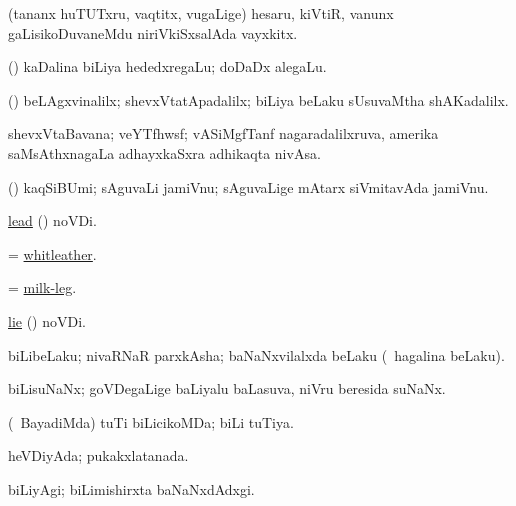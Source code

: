 \bentry
{}
\gl{\nA}
\bmng
(tananx huTUTxru, vaqtitx, \mo vugaLige) hesaru, kiVtiR, \mo vanunx gaLisikoDuvaneMdu niriVkiSxsalAda vayxkitx. 
\emng
\eentry

\bentry
{}
\gl{\nA}
\bmng
(\rUpa) kaDalina biLiya hededxregaLu; doDaDx alegaLu. 
\emng
\eentry

\bentry
{}
\gl{\kirxvi}
\bmng
(\loVvi) beLAgxvinalilx; shevxVtatApadalilx; biLiya beLaku sUsuvaMtha shAKadalilx. 
\emng
\eentry

\bentry
{}
\gl{\nA}
\bmng
shevxVtaBavana; veYTfhwsf; vASiMgfTanf nagaradalilxruva, amerika saMsAthxnagaLa adhayxkaSxra adhikaqta nivAsa. 
\emng
\eentry

\bentry
{}
\gl{\nA}
\bmng
(\birx) kaqSiBUmi; sAguvaLi jamiVnu; sAguvaLige mAtarx siVmitavAda jamiVnu. 
\emng
\eentry

\bentry
{}
\gl{\nA}
\bmng
\hyperref{kandict_l.pdf}{L}{lead(1) pagu(4)}{lead} (\pagu {}) noVDi. 
\emng
\eentry

\bentry
{}
\gl{\nA}
\bmng
= \hyperlink{whitleather}{whitleather}. 
\emng
\eentry

\bentry
{}
\gl{\nA}
\bmng
= \hyperref{kandict_m.pdf}{M}{milk-leg}{milk-leg}. 
\emng
\eentry

\bentry
{}
\gl{\nA}
\bmng
\hyperref{kandict_l.pdf}{L}{lie(3) pagu(7)}{lie} (\pagu {}) noVDi. 
\emng
\eentry

\bentry
{}
\gl{\nA}
\bmng
biLibeLaku; nivaRNaR parxkAsha; baNaNxvilalxda beLaku (\udA\ hagalina beLaku). 
\emng
\eentry

\bentry
{}
\gl{\nA}
\bmng
biLisuNaNx; goVDegaLige baLiyalu baLasuva, niVru beresida suNaNx. 
\emng
\eentry

\bentry
{}
\gl{\gu}
\bmng
(\kanmu\ BayadiMda) tuTi biLicikoMDa; biLi tuTiya. 
\emng
\eentry

\bentry
{}
\gl{\nA}
\bmng
heVDiyAda; pukakxlatanada. 
\emng
\eentry

\bentry
{}
\gl{\kirxvi}
\bmng
biLiyAgi; biLimishirxta baNaNxdAdxgi. 
\emng
\eentry

